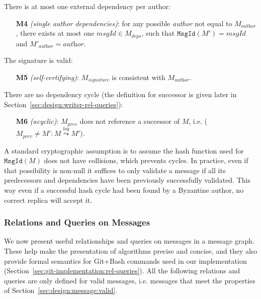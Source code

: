\documentclass[9pt, oneside]{article}   	%
\newcommand{\logleadsto}{\overset{\textit{log}}\leadsto}
\begin{document}
There is at most one external dependency per author:
\begin{tcolorbox}
\begin{enumerate}
	\item[\textbf{M4}] \textit{(single author dependencies)}: for any possible \textit{author} not equal to $M_\textit{author}$, there exists at most one $\textit{msgId} \in M_\textit{deps}$, such that $\texttt{MsgId}(M') = \textit{msgId}$ and $M'_\textit{author} = \textit{author}$.
\end{enumerate}
\end{tcolorbox}

The signature is valid:
\begin{tcolorbox}
\begin{enumerate}
	\item[\textbf{M5}] \textit{(self-certifying)}: $M_\textit{signature}$ is consistent with $M_\textit{author}$.
\end{enumerate}
\end{tcolorbox}

There are no dependency cycle (the definition for successor is given later in Section~\ref{sec:design:writer-rel-queries}):
\begin{tcolorbox}
\begin{enumerate}
	\item[\textbf{M6}] \textit{(acyclic)}: $M_\textit{prev}$ does not reference a successor of $M$, i.e. ($M_\textit{prev} \neq M' : M \logleadsto M'$).
\end{enumerate}
\end{tcolorbox}

A standard cryptographic assumption is to assume the hash function used for $\texttt{MsgId}(M)$ does not have collisions, which prevents cycles. In practice, even if that possibility is non-null it suffices to only validate a message if all its predecessors and dependencies have been previously successfully validated. This way even if a successful hash cycle had been found by a Byzantine author, no correct replica will accept it.

\subsubsection{Relations and Queries on Messages}
\label{sec:design:queries}

We now present useful relationships and queries on messages in a message graph. These help make the presentation of algorithms  precise and concise, and they also provide formal semantics for Git+Bash commands used in our implementation (Section~\ref{sec:git-implementation:rel-queries}). All the following relations and queries are only defined for valid messages, i.e. messages that meet the properties of Section~\ref{sec:design:message:valid}.
\end{document}
